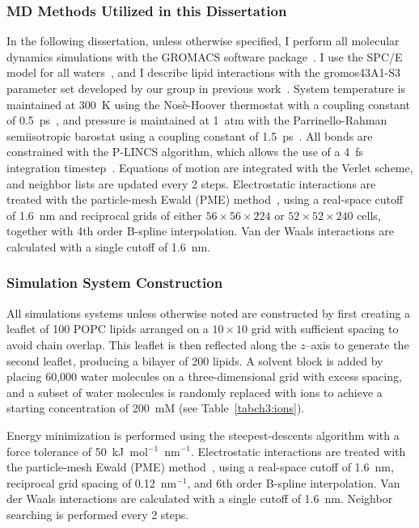\subsubsection{MD Methods Utilized in this Dissertation}
In the following dissertation, unless otherwise specified, I perform all molecular dynamics simulations with the GROMACS software 
package~\cite{abraham:2015,pall:2014,van:2005,lindahl:2001,berendsen:1995,gromacs}.
I use the SPC/E model for all waters~\cite{spce}, and I describe lipid interactions
with the gromos43A1-S3 parameter set developed by our group in previous work~\cite{chiu:2009}.
System temperature is maintained at 300~K using the Nos\`e-Hoover thermostat
with a coupling constant of 0.5~ps~\cite{nose:1983}, and pressure is maintained
at 1~atm with the Parrinello-Rahman semiisotropic barostat using a coupling constant of 1.5~ps~\cite{parrinello:1981}.
All bonds are constrained with the P-LINCS algorithm, which allows the use of a 4~fs integration timestep~\cite{lincs}.
Equations of motion are integrated with the Verlet scheme, and neighbor lists are updated every 2 steps.
Electrostatic interactions are treated with the particle-mesh Ewald (PME) method~\cite{essmann:1995},
using a real-space cutoff of 1.6~nm and reciprocal grids of either
$56 \times 56 \times 224$ or $52 \times 52 \times 240$ cells,
together with 4th order B-spline interpolation.
Van der Waals interactions are calculated with a single cutoff of 1.6~nm.
\subsubsection{Simulation System Construction}
All simulations systems unless otherwise noted are constructed by first creating a leaflet of 100 POPC lipids arranged
on a $10 \times 10$ grid with sufficient spacing to avoid chain overlap.
This leaflet is then reflected along the $z$--axis to generate the second
leaflet, producing a bilayer of 200 lipids. A solvent block is added by
placing 60,000 water molecules on a three-dimensional grid with excess spacing,
and a subset of water molecules is randomly replaced with ions to achieve a
starting concentration of 200~mM (see Table~\ref{tabch3:ions}).

Energy minimization is performed using the steepest-descents algorithm with a
force tolerance of 50~kJ~mol$^{-1}$~nm$^{-1}$. Electrostatic interactions are
treated with the particle-mesh Ewald (PME) method~\cite{essmann:1995}, using a
real-space cutoff of 1.6~nm, reciprocal grid spacing of 0.12~nm$^{-1}$, and
6th order B-spline interpolation. Van der Waals interactions are calculated
with a single cutoff of 1.6~nm. Neighbor searching is performed every 2 steps.

